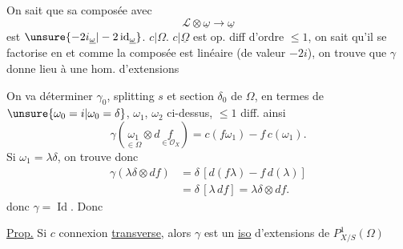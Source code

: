 On sait que sa composée avec
\[
\mathcal{L}\otimes\underline{\omega}\longrightarrow\underline{\omega}
\]
est $\unsure{-2i_{\underline{\omega}}|-2\operatorname{id}_{\underline{\omega}}}$.   $c|\Omega$.
$c|\underline{\Omega}$ est op. diff d'ordre $\leq1$, on sait qu'il se factorise en
et comme la composée
est linéaire (de valeur $-2i$), on trouve que $\gamma$ donne lieu à une hom. d'extensions

On va déterminer $\gamma_0$,  splitting $s$ et section $\delta_0$ de $\Omega$, en termes de $\unsure{\omega_0=i|\omega_0=\delta}$, $\omega_1$, $\omega_2$ ci-dessus,    $\leq1$ diff.
ainsi
\[
\gamma(\underset{\in\Omega}{\omega_1}\otimes d\underset{\in\mathcal{O}_X}{f})=c(f\omega_1)-f\,c(\omega_1).
\]
Si $\omega_1=\lambda\delta$, on trouve donc
\[
\begin{aligned}
\gamma(\lambda\delta\otimes df)&=\delta\,[d(f\lambda)-f\,d(\lambda)]\\
&=\delta\,[\lambda\,df]=\lambda\delta\otimes df.
\end{aligned}
\]
donc $\gamma=\operatorname{Id}$. Donc

\uline{Prop.} Si $c$ connexion \uline{transverse},  alors $\gamma$ est un \uline{iso} d'extensions de $P^1_{X/S}(\Omega)$
